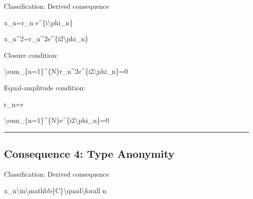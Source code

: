 \documentclass[
  a4paper,
]{article}
\newenvironment{Shaded}{}{}
\newcommand{\NormalTok}[1]{#1}
\begin{document}
Classification: Derived consequence

\begin{Shaded}
\begin{Highlighting}[]
\NormalTok{x\_n=r\_n e\^{}\{i\textbackslash{}phi\_n\}}
\end{Highlighting}
\end{Shaded}

\begin{Shaded}
\begin{Highlighting}[]
\NormalTok{x\_n\^{}2=r\_n\^{}2e\^{}\{i2\textbackslash{}phi\_n\}}
\end{Highlighting}
\end{Shaded}

Closure condition:

\begin{Shaded}
\begin{Highlighting}[]
\NormalTok{\textbackslash{}sum\_\{n=1\}\^{}\{N\}r\_n\^{}2e\^{}\{i2\textbackslash{}phi\_n\}=0}
\end{Highlighting}
\end{Shaded}

Equal-amplitude condition:

\begin{Shaded}
\begin{Highlighting}[]
\NormalTok{r\_n=r}
\end{Highlighting}
\end{Shaded}

\begin{Shaded}
\begin{Highlighting}[]
\NormalTok{\textbackslash{}sum\_\{n=1\}\^{}\{N\}e\^{}\{i2\textbackslash{}phi\_n\}=0}
\end{Highlighting}
\end{Shaded}

\begin{center}\rule{0.5\linewidth}{0.5pt}\end{center}

\subsection{Consequence 4: Type
Anonymity}\label{consequence-4-type-anonymity}

Classification: Derived consequence

\begin{Shaded}
\begin{Highlighting}[]
\NormalTok{x\_n\textbackslash{}in\textbackslash{}mathbb\{C\}\textbackslash{}quad\textbackslash{}forall n}
\end{Highlighting}
\end{Shaded}
\end{document}
